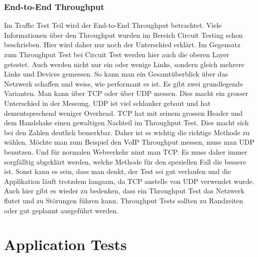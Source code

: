 \documentclass[a4,12pt]{scrartcl}
\begin{document}
\subsubsection{End-to-End Throughput}
Im Traffic Test Teil wird der End-to-End Throughput betrachtet. Viele Informationen über den Throughput wurden im Bereich Circuit Testing schon beschrieben. Hier wird daher nur noch der Unterschied erklärt.\newline\newline
Im Gegensatz zum Throughput Test bei Circuit Test werden hier auch die oberen Layer getestet. Auch werden nicht nur ein oder wenige Links, sondern gleich mehrere Links und Devices gemessen.
So kann man ein Gesamtüberblick über das Netzwerk schaffen und weiss, wie performant es ist.\newline\newline
Es gibt zwei grundlegende Varianten. Man kann über TCP oder über UDP messen. Dies macht ein grosser Unterschied in der Messung. 
UDP ist viel schlanker gebaut und hat dementsprechend weniger Overhead. TCP hat mit seinem grossen Header und dem Handshake einen gewaltigen Nachteil im Throughput Test. Dies macht sich bei den Zahlen deutlich bemerkbar.\newline\newline
Daher ist es wichtig die richtige Methode zu wählen.
Möchte man zum Beispiel den VoIP Throughput messen, muss man UDP benutzen. Und für normalen Webverkehr nimt man TCP. Es muss daher immer sorgfälltig abgeklärt werden, welche Methode für den speziellen Fall die bessere ist. Sonst kann es sein, dass man denkt, der Test sei gut verlaufen und die Applikation läuft trotzdem langsam, da TCP anstelle von UDP verwendet wurde.\newline\newline
Auch hier gibt es wieder zu bedenken, dass ein Throughput Test das Netzwerk flutet und zu Störungen führen kann. Throughput Tests sollten zu Randzeiten oder gut geplannt ausgeführt werden. 
\newpage
\section{Application Tests}
\end{document}
